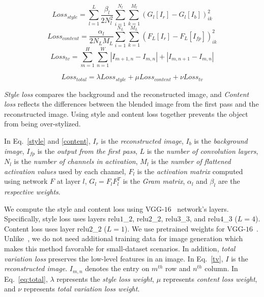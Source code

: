 \begin{equation}
    \label{style}
    Loss_{style} = \sum_{l=1}^{L} \frac{\beta_l}{2N_l^2} \sum_{i=1}^{N_l} \sum_{k=1}^{M_l}(G_l[I_{r}]-G_l[I_{b}])_{ik}^2
\end{equation}
\begin{equation}
    \label{content}
    Loss_{content} = \frac{\alpha_l}{2N_LM_L} \sum_{i=1}^{N_L} \sum_{k=1}^{M_L}(F_L[I_{r}]-F_L[I_{fp}])_{ik}^2
\end{equation}
\begin{equation}
    \label{tv}
    Loss_{tv} = \sum_{m=1}^{H} \sum_{n=1}^{W} |I_{m+1,n} - I_{m,n}| + |I_{m,n+1} - I_{m,n}|
\end{equation}

\begin{equation}
    \label{eq:total}
    Loss_{total} = \lambda Loss_{style} + \mu Loss_{content} + \nu Loss_{tv}
\end{equation}


\textit{Style loss} compares the background and the reconstructed image, and \textit{Content loss} reflects the differences between the blended image from the first pass and the reconstructed image.
Using style and content loss together prevents the object from being over-stylized.

In Eq.~\ref{style} and \ref{content}, $I_r$ is the \textit{reconstructed image}, $I_b$ is the \textit{background image}, $I_{fp}$ is the \textit{output from the first pass}, $L$ is the \textit{number of convolution layers}, $N_l$ is the \textit{number of channels in activation}, $M_l$ is the \textit{number of flattened activation values} used by each channel, $F_l$ is the \textit{activation matrix} computed using network $F$ at layer $l$, $G_l = F_lF_l^T$ is the \textit{Gram matrix}, $\alpha_l$ and $\beta_l$ are the \textit{respective weights}.


We compute the style and content loss using VGG-$16$~\cite{liu_very_2015} network’s layers. Specifically, style loss uses layers relu$1$\_$2$, relu$2$\_$2$, relu$3$\_$3$, and relu$4$\_$3$ ($L=4$). Content loss uses layer relu$2$\_$2$ ($L=1$). We use pretrained weights for VGG-$16$~\cite{liu_very_2015}.
Unlike~\cite{wu_gp-gan_2019}, we do not need additional training data for image generation which makes this method favorable for small-dataset scenarios.
In addition, \textit{total variation loss} preserves the low-level features in an image.  In Eq.~\ref{tv}, $I$ is the \textit{reconstructed image}. $I_{m,n}$ denotes the entry on $m^{th}$ row and $n^{th}$ column.
In Eq.~\ref{eq:total}, $\lambda$ represents the \textit{style loss weight}, $\mu$ represents \textit{content loss weight}, and $\nu$ represents \textit{total variation loss weight}.


